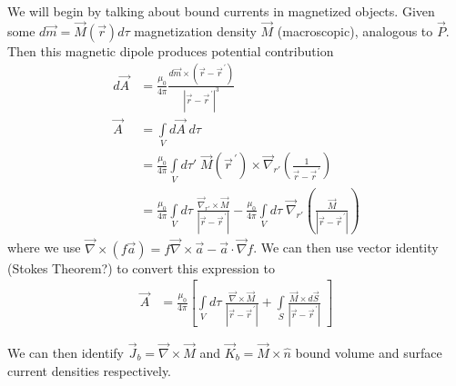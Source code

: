 \documentclass[10pt]{report}
\newcommand{\pvec}[1]{\vec{#1}^{\,\prime}}
\newcommand{\abs}[1]{\left|#1\right|}
\begin{document}
We will begin by talking about bound currents in magnetized objects. Given some $d\vec{m} = \vec{M}(\vec{r}) d\tau$ magnetization density $\vec{M}$ (macroscopic), analogous to $\vec{P}$. Then this magnetic dipole produces potential contribution
\begin{align}
    d\vec{A} &= \frac{\mu_0}{4\pi}\frac{d\vec{m} \times (\vec{r} - \pvec{r})}{\abs{\vec{r} - \pvec{r}}^3}\\
    \vec{A} &= \int\limits_{V}^{}d\vec{A}\;d\tau\\
    &= \frac{\mu_0}{4\pi}\int\limits_{V}^{}d\tau'\;\vec{M}(\pvec{r}) \times \vec{\nabla}_{r'}\left( \frac{1}{\vec{r} - \pvec{r}} \right)\\
    &= \frac{\mu_0}{4\pi}\int\limits_{V}^{}d\tau\;\frac{\vec{\nabla}_{r'}\times \vec{M}}{\abs{\vec{r} - \pvec{r}}} - \frac{\mu_0}{4\pi}\int\limits_{V}^{}d\tau\;\vec{\nabla}_{r'}\left( \frac{\vec{M}}{\abs{\vec{r} - \pvec{r}}} \right)
\end{align}
where we use $\vec{\nabla} \times (f\vec{a}) = f\vec{\nabla}\times \vec{a} - \vec{a}\cdot \vec{\nabla}f$. We can then use vector identity (Stokes Theorem?) to convert this expression to
\begin{align}
    \vec{A} &= \frac{\mu_0}{4\pi}\left[ \int\limits_{V}^{}d\tau\;\frac{\vec{\nabla}\times \vec{M}}{\abs{\vec{r} - \pvec{r}}} + \int\limits_{S}^{}\frac{\vec{M}\times d\vec{S}}{\abs{\vec{r} - \pvec{r}}}\; \right]
\end{align}

We can then identify $\vec{J}_b = \vec{\nabla} \times \vec{M}$ and $\vec{K}_b = \vec{M}\times \hat{n}$ bound volume and surface current densities respectively.
\end{document}
